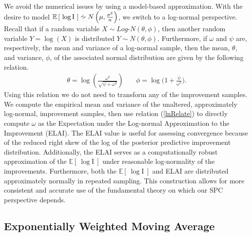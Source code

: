 \documentclass{article}
\newcommand{\E}[1]{
        \mathbb{E}\left[~#1~\right]
}
\newcommand*{\approxdist}{\mathrel{\vcenter{\offinterlineskip
\vskip-.25ex\hbox{\hskip.55ex$\cdot$}\vskip-.25ex\hbox{$\sim$}
\vskip-.5ex\hbox{\hskip.55ex$\cdot$}}}}
\begin{document}
%
%

%
We avoid the numerical issues by using a model-based approximation. With the 
desire to model $\mathbb{E}\left[~\log\text{I}~\right] \approxdist N\left(\mu, \frac{\sigma^2}{n}\right)$, 
we switch to a log-normal perspective. Recall that if a random variable 
\mbox{$X\sim Log$-$N(\theta, \phi)$,} then another random variable $Y=\log(X)$ 
is distributed $Y\sim N(\theta, \phi)$. Furthermore, if $\omega$ and $\psi$ are, 
respectively, the mean and variance of a log-normal sample, then the mean, 
$\theta$, and variance, $\phi$, of the associated normal distribution are 
given by the following relation.
\begin{eqnarray}
\theta = \log\left( \frac{\omega^2}{\sqrt{\psi+\omega^2}} \right) &~&  \phi = \log\bigg( 1+ \frac{\psi}{\omega^2} \bigg).
\label{lnRelate}
\end{eqnarray}
Using this relation we do not need to transform any of the improvement samples.
We compute the empirical mean and variance of the unaltered, approximately 
log-normal, improvement samples, then use relation (\ref{lnRelate}) to 
directly compute $\omega$ as the Expectation under the Log-normal Approximation 
to the Improvement (ELAI). The ELAI value is useful for assessing convergence 
because of the reduced right skew of the log of the posterior predictive 
improvement distribution. Additionally, the ELAI serves as a computationally 
robust approximation of the $\E{\log\text{I}}$ under reasonable log-normality 
of the improvements. Furthermore, both the $\E{\log\text{I}}$ and ELAI are 
distributed approximately normally in repeated sampling. This construction 
allows for more consistent and accurate use of the fundamental theory on which 
our SPC perspective depends.

%
%
\subsection{Exponentially Weighted Moving Average}
%
%
\end{document}
